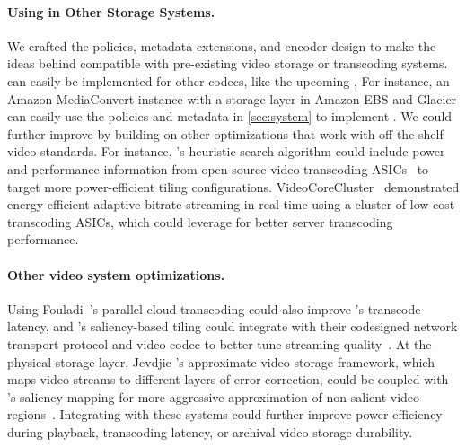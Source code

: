 \paragraph{Using \name in Other Storage Systems.}
We crafted the policies, metadata extensions, and encoder design to make the ideas behind \nameStore{} compatible with pre-existing video storage or transcoding systems.
\name can easily be implemented for other codecs, like the upcoming \avone,
For instance, an Amazon MediaConvert instance with a storage layer in Amazon EBS and Glacier can easily use the policies and metadata in \ref{sec:system} to implement \name.
We could further improve \name by building on other optimizations that work with off-the-shelf video standards.
For instance, \name's heuristic search algorithm could include power and performance information from open-source video transcoding ASICs~\cite{asicclouds, zhang2017racetosleep} to target more power-efficient tiling configurations.
VideoCoreCluster~\cite{liu2016greenvid} demonstrated energy-efficient adaptive bitrate streaming in real-time using a cluster of low-cost transcoding ASICs, which \name could leverage for better server transcoding performance.

\paragraph{Other video system optimizations.}
Using Fouladi~\etal's parallel cloud transcoding could also improve \name's transcode latency, and \name's saliency-based tiling could integrate with their codesigned network transport protocol and video codec to better tune streaming quality~\cite{fouladi2018salsify, fouladi2017excamera}.
At the physical storage layer, Jevdjic \etal's approximate video storage framework, which maps video streams to different layers of error correction, could be coupled with \name's saliency mapping for more aggressive approximation of non-salient video regions~\cite{jevdjic2017approxvid}.
Integrating \name with these systems could further improve power efficiency during playback, transcoding latency, or archival video storage durability.
